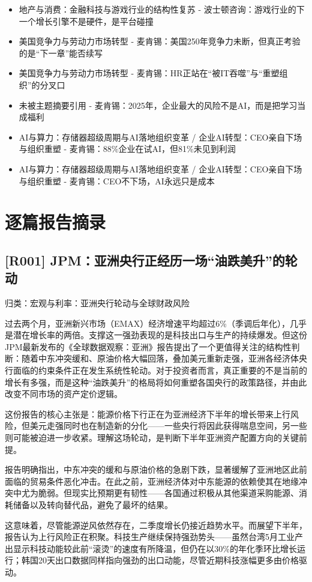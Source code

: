 \documentclass[11pt]{ctexart}
\begin{document}
\begin{itemize}
  \item [R017] 地产与消费：金融科技与游戏行业的结构性复苏 - 波士顿咨询：游戏行业的下一个增长引擎不是硬件，是平台碰撞
  \item [R018] 美国竞争力与劳动力市场转型 - 麦肯锡：美国250年竞争力未断，但真正考验的是“下一章”能否续写
  \item [R019] 美国竞争力与劳动力市场转型 - 麦肯锡：HR正站在“被IT吞噬”与“重塑组织”的分叉口
  \item [R020] 未被主题摘要引用 - 麦肯锡：2025年，企业最大的风险不是AI，而是把学习当成福利
  \item [R021] AI与算力：存储器超级周期与AI落地组织变革 / 企业AI转型：CEO亲自下场与组织重塑 - 麦肯锡：88\%企业在试AI，但81\%未见到利润
  \item [R022] AI与算力：存储器超级周期与AI落地组织变革 / 企业AI转型：CEO亲自下场与组织重塑 - 麦肯锡：CEO不下场，AI永远只是成本
\end{itemize}
\section{逐篇报告摘录}
\subsection{[R001] JPM：亚洲央行正经历一场“油跌美升”的轮动}
{\small\color{refgray}归类：宏观与利率：亚洲央行轮动与全球财政风险}

过去两个月，亚洲新兴市场（EMAX）经济增速平均超过6\%（季调后年化），几乎是潜在增长率的两倍。支撑这一强劲表现的是科技出口与生产的持续爆发。但这份JPM最新发布的《全球数据观察：亚洲》报告提出了一个更值得关注的结构性判断：随着中东冲突缓和、原油价格大幅回落，叠加美元重新走强，亚洲各经济体央行面临的约束条件正在发生系统性轮动。对于投资者而言，真正重要的不是当前的增长有多强，而是这种“油跌美升”的格局将如何重塑各国央行的政策路径，并由此改变不同市场的资产定价逻辑。

这份报告的核心主张是：能源价格下行正在为亚洲经济下半年的增长带来上行风险，但美元走强同时也在制造新的分化——一些央行将因此获得喘息空间，另一些则可能被迫进一步收紧。理解这场轮动，是判断下半年亚洲资产配置方向的关键前提。

报告明确指出，中东冲突的缓和与原油价格的急剧下跌，显著缓解了亚洲地区此前面临的贸易条件恶化冲击。在此之前，亚洲经济体对中东能源的依赖使其在地缘冲突中尤为脆弱。但现实比预期更有韧性——各国通过积极从其他渠道采购能源、消耗储备以及转向替代品，避免了最坏的结果。

这意味着，尽管能源逆风依然存在，二季度增长仍接近趋势水平。而展望下半年，报告认为上行风险正在积聚。科技生产继续保持强劲势头——虽然台湾5月工业产出显示科技动能较此前“滚烫”的速度有所降温，但仍在以30\%的年化季环比增长运行；韩国20天出口数据同样指向强劲的出口动能，尽管近期科技涨幅更多由价格驱动。
\end{document}
